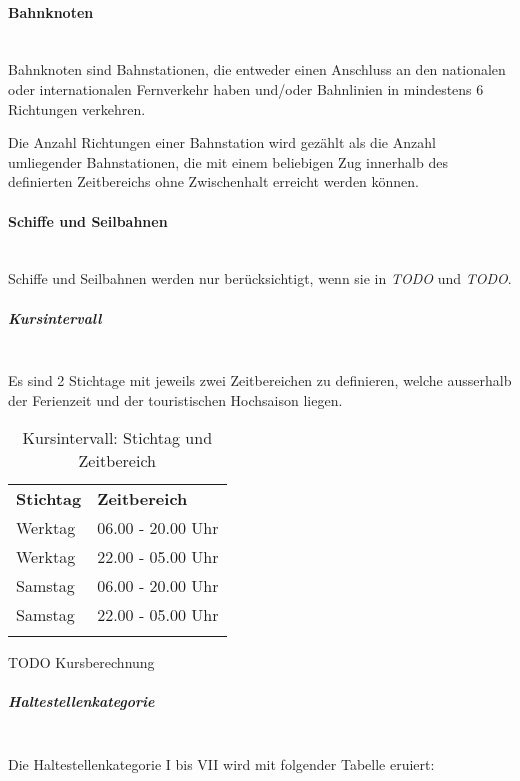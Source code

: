 \paragraph{Bahnknoten}~\\
Bahnknoten sind Bahnstationen, die entweder einen Anschluss an den nationalen oder internationalen Fernverkehr haben und/oder Bahnlinien in mindestens 6 Richtungen verkehren.

Die Anzahl Richtungen einer Bahnstation wird gezählt als die Anzahl umliegender Bahnstationen, die mit einem beliebigen Zug innerhalb des definierten Zeitbereichs ohne Zwischenhalt erreicht werden können.

\paragraph{Schiffe und Seilbahnen}~\\
Schiffe und Seilbahnen werden nur berücksichtigt, wenn sie in \emph{TODO} und \emph{TODO}.


\subparagraph{Kursintervall}~\\
\label{Berechnungsmethodik OeVGK18:Kursintervall}
Es sind 2 Stichtage mit jeweils zwei Zeitbereichen zu definieren, welche ausserhalb der Ferienzeit und der touristischen Hochsaison liegen.

\begin{longtable}[c]{l l}
    \midrule
    \textbf{Stichtag}
                            & \textbf{Zeitbereich}\\
    Werktag
                            & 06.00 - 20.00 Uhr\\
    Werktag
                            & 22.00 - 05.00 Uhr\\
    Samstag
                            & 06.00 - 20.00 Uhr\\
    Samstag
                            & 22.00 - 05.00 Uhr\\
    \bottomrule
\caption{Kursintervall: Stichtag und Zeitbereich}
\label{table:Ermittlung Kursintervall: Stichtag und Zeitbereich}
\end{longtable}

TODO Kursberechnung

\subparagraph{Haltestellenkategorie}~\\
\label{Berechnungsmethodik OeVGK18:Haltestellenkategorie}
Die Haltestellenkategorie I bis VII wird mit folgender Tabelle eruiert:

